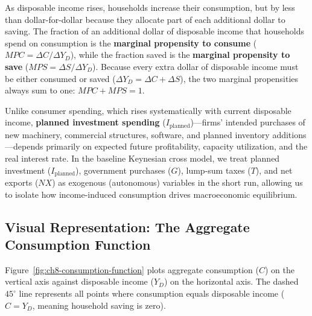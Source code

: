 \documentclass[11pt,letterpaper]{article}
\begin{document}
As disposable income rises, households increase their consumption, but by less than dollar-for-dollar because they allocate part of each additional dollar to saving. The fraction of an additional dollar of disposable income that households spend on consumption is the \textbf{marginal propensity to consume} ($MPC = \Delta C / \Delta Y_D$), while the fraction saved is the \textbf{marginal propensity to save} ($MPS = \Delta S / \Delta Y_D$). Because every extra dollar of disposable income must be either consumed or saved ($\Delta Y_D = \Delta C + \Delta S$), the two marginal propensities always sum to one: $MPC + MPS = 1$.

Unlike consumer spending, which rises systematically with current disposable income, \textbf{planned investment spending} ($I_{\text{planned}}$)—firms' intended purchases of new machinery, commercial structures, software, and planned inventory additions—depends primarily on expected future profitability, capacity utilization, and the real interest rate. In the baseline Keynesian cross model, we treat planned investment ($I_{\text{planned}}$), government purchases ($G$), lump-sum taxes ($T$), and net exports ($NX$) as exogenous (autonomous) variables in the short run, allowing us to isolate how income-induced consumption drives macroeconomic equilibrium.

\subsection*{Visual Representation: The Aggregate Consumption Function}
Figure~\ref{fig:ch8-consumption-function} plots aggregate consumption ($C$) on the vertical axis against disposable income ($Y_D$) on the horizontal axis. The dashed $45^\circ$ line represents all points where consumption equals disposable income ($C = Y_D$, meaning household saving is zero).
\end{document}
